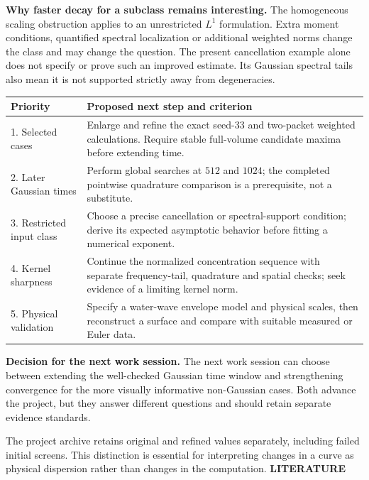 \documentclass[10pt,letterpaper]{article}
\newcommand{\eyebrow}[1]{{\color{teal}\normalsize\bfseries #1}\par}
\newcommand{\callout}[1]{\par\smallskip\colorbox{pale}{\parbox{.96\linewidth}{\vspace{5pt}#1\vspace{5pt}}}\par\smallskip}
\begin{document}
\textbf{Why faster decay for a subclass remains interesting.} The homogeneous
scaling obstruction applies to an unrestricted $L^1$ formulation. Extra moment
conditions, quantified spectral localization or additional weighted norms change
the class and may change the question. The present cancellation example alone
does not specify or prove such an improved estimate. Its Gaussian spectral tails
also mean it is not supported strictly away from degeneracies.

\begin{center}\begin{tabular}{p{.25\linewidth}p{.65\linewidth}}\toprule
Priority & Proposed next step and criterion\\\midrule
1. Selected cases & Enlarge and refine the exact seed-33 and two-packet weighted
calculations. Require stable full-volume candidate maxima before extending time.\\
2. Later Gaussian times & Perform global searches at $512$ and $1024$; the completed
pointwise quadrature comparison is a prerequisite, not a substitute.\\
3. Restricted input class & Choose a precise cancellation or spectral-support
condition; derive its expected asymptotic behavior before fitting a numerical exponent.\\
4. Kernel sharpness & Continue the normalized concentration sequence with separate
frequency-tail, quadrature and spatial checks; seek evidence of a limiting kernel norm.\\
5. Physical validation & Specify a water-wave envelope model and physical scales,
then reconstruct a surface and compare with suitable measured or Euler data.\\\bottomrule
\end{tabular}\end{center}
\callout{\textbf{Decision for the next work session.} The next work session can choose between extending the
well-checked Gaussian time window and strengthening convergence for the more
visually informative non-Gaussian cases. Both advance the project, but they answer
different questions and should retain separate evidence standards.}

The project archive retains original and refined values separately, including
failed initial screens. This distinction is essential for interpreting changes
in a curve as physical dispersion rather than changes in the computation.
\newpage
{}\label{literature}
\eyebrow{LITERATURE}
\end{document}
